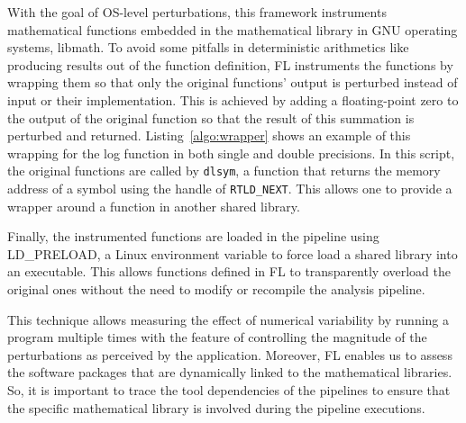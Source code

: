 \documentclass[conference]{IEEEtran}
\begin{document}
With the goal of OS-level perturbations, this framework instruments mathematical functions embedded
in the mathematical library in GNU operating systems, libmath.
To avoid some pitfalls in deterministic arithmetics like producing results out of the function definition,
FL instruments the functions by wrapping them so that only the original functions' output
is perturbed instead of input or their implementation.
This is achieved by adding a floating-point zero to the output of the original function so that the result of this summation
is perturbed and returned.
Listing~\ref{algo:wrapper} shows an example of this wrapping for the log function in both single and double precisions.
In this script, the original functions are called by \texttt{dlsym}, a function that returns the memory address of a symbol
using the handle of \texttt{RTLD\_NEXT}.
This allows one to provide a wrapper around a function in another shared library. 



%


Finally, the instrumented functions are loaded in the pipeline using LD\_PRELOAD, a Linux environment variable
to force load a shared library into an executable.
This allows functions defined in FL to transparently
overload the original ones without the need to modify or recompile the analysis pipeline.

This technique allows measuring the effect of numerical variability by running a program multiple times
with the feature of controlling the magnitude of the perturbations as perceived by the application.
Moreover, FL enables us to assess the software packages that are dynamically linked to the mathematical libraries.
So, it is important to trace the tool dependencies of the pipelines to ensure that the specific mathematical library
is involved during the pipeline executions.
\end{document}
